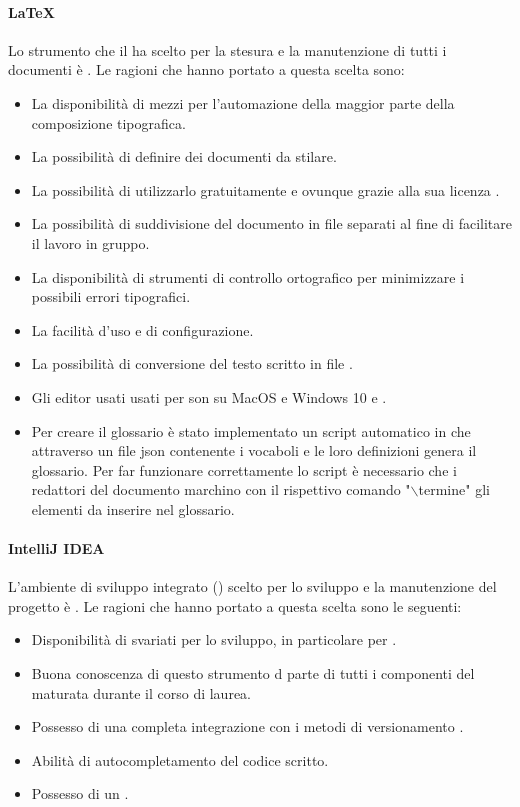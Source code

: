 \paragraph{LaTeX}
Lo strumento che il  ha scelto per la stesura e la manutenzione di tutti i documenti è . Le ragioni che hanno portato a questa scelta sono:
\begin{itemize}
\item La disponibilità di mezzi per l'automazione della maggior parte della composizione tipografica.
\item La possibilità di definire  dei documenti da stilare.
\item La possibilità di utilizzarlo gratuitamente e ovunque grazie alla sua licenza .
\item La possibilità di suddivisione del documento in file separati al fine di facilitare il lavoro in gruppo.
\item La disponibilità di strumenti di controllo ortografico per minimizzare i possibili errori tipografici.
\item La facilità d'uso e di configurazione.
\item La possibilità di conversione del testo scritto in file .
\item Gli editor usati usati per  son  su MacOS e Windows 10 e .
\item Per creare il glossario è stato implementato un script automatico in  che attraverso un file json contenente i vocaboli e le loro definizioni genera il glossario. Per far funzionare correttamente lo script è necessario che i redattori del documento marchino con il rispettivo comando "$\backslash$termine" gli elementi da inserire nel glossario.
\end{itemize}

\paragraph{IntelliJ IDEA}
L'ambiente di sviluppo integrato () scelto per lo sviluppo e la manutenzione del progetto è . Le ragioni che hanno portato a questa scelta sono le seguenti:
\begin{itemize}
\item Disponibilità di svariati  per lo sviluppo, in particolare per .
\item Buona conoscenza di questo strumento d parte di tutti i componenti del  maturata durante il corso di laurea.
\item Possesso di una completa integrazione con i metodi di versionamento .
\item Abilità di autocompletamento del codice  scritto.
\item Possesso di un  .
\end{itemize}

